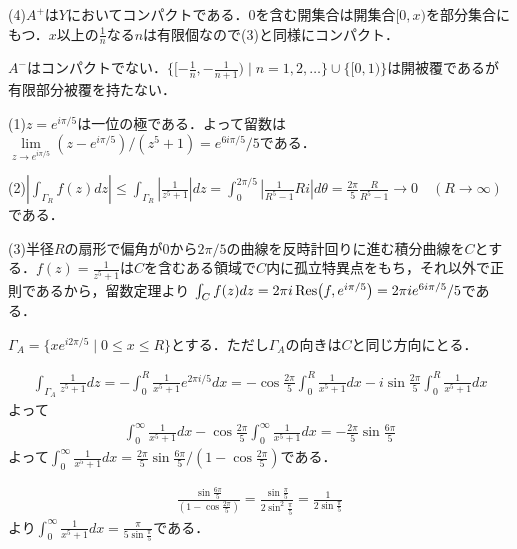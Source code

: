 \documentclass[
		book,
		head_space=20mm,
		foot_space=20mm,
		gutter=10mm,
		line_length=190mm
]{jlreq}
\begin{document}
(4)$A^+$は$Y$においてコンパクトである．$0$を含む開集合は開集合$[0,x)$を部分集合にもつ．$x$以上の$\frac{1}{n}$なる$n$は有限個なので(3)と同様にコンパクト．

$A^-$はコンパクトでない．$\{[-\frac{1}{n},-\frac{1}{n+1}) \mid n =1,2,\dots\}\cup \{[0,1)\}$は開被覆であるが有限部分被覆を持たない．

(1)$z=e^{i\pi/5}$は一位の極である．よって留数は$\lim\limits_{z \to e^{i\pi/5}}(z-e^{i\pi/5})/(z^5+1)=e^{6i\pi/5}/5$である．

(2)$|\int_{\Gamma_R}f(z)dz|\le \int_{\Gamma_R} |\frac{1}{z^5+1}|dz=\int_{0}^{2\pi/5} |\frac{1}{R^5-1}Ri|d\theta=\frac{2\pi}{5}\frac{R}{R^5-1}\rightarrow 0\quad (R\rightarrow \infty)$である．

(3)半径$R$の扇形で偏角が$0$から$2\pi/5$の曲線を反時計回りに進む積分曲線を$C$とする．$f(z)=\frac{1}{z^5+1}$は$C$を含むある領域で$C$内に孤立特異点をもち，それ以外で正則であるから，留数定理より
$\int_C f(z)dz=2\pi i \Res(f,e^{i\pi/5})=2\pi ie^{6i\pi/5}/5$である．

$\Gamma_A=\{ xe^{i2\pi/5} \mid 0 \le x \le R\}$とする．ただし$\Gamma_A$の向きは$C$と同じ方向にとる．

\begin{align}
    \int_{\Gamma_A} \frac{1}{z^5+1}dz=-\int_0^R \frac{1}{x^5+1}e^{2\pi i/5}dx
    =-\cos \frac{2\pi}{5}\int_0^R \frac{1}{x^5+1}dx-i\sin \frac{2\pi}{5}\int_0^R \frac{1}{x^5+1}dx
\end{align}
よって
\begin{align}
    \int_0^\infty \frac{1}{x^5+1}dx-\cos \frac{2\pi}{5}\int_0^\infty \frac{1}{x^5+1}dx=-\frac{2\pi}{5}\sin \frac{6\pi}{5}
\end{align}
よって$\int_0^\infty \frac{1}{x^5+1}dx=\frac{2\pi}{5}\sin \frac{6\pi}{5}/(1-\cos \frac{2\pi}{5})$である．

\begin{align}
    \frac{\sin \frac{6\pi}{5}}{(1-\cos \frac{2\pi}{5})}= \frac{\sin \frac{\pi}{5}}{2\sin^2 \frac{\pi}{5}}=\frac{1}{2\sin \frac{\pi}{5}}
\end{align}
より$\int_0^\infty \frac{1}{x^5+1}dx=\frac{\pi}{5\sin \frac{\pi}{5}}$である．
\end{document}
